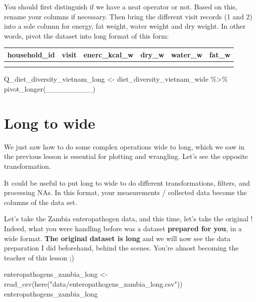 \documentclass[
  letterpaper,
  DIV=11,
  numbers=noendperiod]{scrreprt}
\newenvironment{Shaded}{\begin{snugshade}}{\end{snugshade}}
\newcommand{\FunctionTok}[1]{\textcolor[rgb]{0.28,0.35,0.67}{#1}}
\newcommand{\NormalTok}[1]{\textcolor[rgb]{0.00,0.23,0.31}{#1}}
\newcommand{\OtherTok}[1]{\textcolor[rgb]{0.00,0.23,0.31}{#1}}
\newcommand{\SpecialCharTok}[1]{\textcolor[rgb]{0.37,0.37,0.37}{#1}}
\newcommand{\StringTok}[1]{\textcolor[rgb]{0.13,0.47,0.30}{#1}}
\begin{document}
\begin{tcolorbox}
You should first distinguish if we have a neat operator or not. Based on
this, rename your columns if necessary. Then bring the different visit
records (1 and 2) into a sole column for energy, fat weight, water
weight and dry weight. In other words, pivot the dataset into long
format of this form:

\begin{longtable}[]{@{}llllll@{}}
\toprule\noalign{}
household\_id & visit & enerc\_kcal\_w & dry\_w & water\_w & fat\_w \\
\midrule\noalign{}
\endhead
\bottomrule\noalign{}
\endlastfoot
& & & & & \\
& & & & & \\
\end{longtable}

\begin{Shaded}
\begin{Highlighting}[]
\NormalTok{Q\_diet\_diversity\_vietnam\_long }\OtherTok{\textless{}{-}}
\NormalTok{  diet\_diversity\_vietnam\_wide }\SpecialCharTok{\%\textgreater{}\%}
  \FunctionTok{pivot\_longer}\NormalTok{(\_\_\_\_\_\_\_\_\_)}
\end{Highlighting}
\end{Shaded}

\end{tcolorbox}

\hypertarget{long-to-wide}{%
\section{Long to wide}\label{long-to-wide}}

We just saw how to do some complex operations wide to long, which we saw
in the previous lesson is essential for plotting and wrangling. Let's
see the opposite transformation.

It could be useful to put long to wide to do different transformations,
filters, and processing NAs. In this format, your measurements /
collected data become the columns of the data set.

Let's take the Zambia enteropathogen data, and this time, let's take the
original ! Indeed, what you were handling before was a dataset
\textbf{prepared for you}, in a wide format. \textbf{The original
dataset is long} and we will now see the data preparation I did
beforehand, behind the scenes. You're almost becoming the teacher of
this lesson ;)

\begin{Shaded}
\begin{Highlighting}[]
\NormalTok{enteropathogens\_zambia\_long }\OtherTok{\textless{}{-}} \FunctionTok{read\_csv}\NormalTok{(}\FunctionTok{here}\NormalTok{(}\StringTok{"data/enteropathogens\_zambia\_long.csv"}\NormalTok{))}
\NormalTok{enteropathogens\_zambia\_long}
\end{Highlighting}
\end{Shaded}
\end{document}
